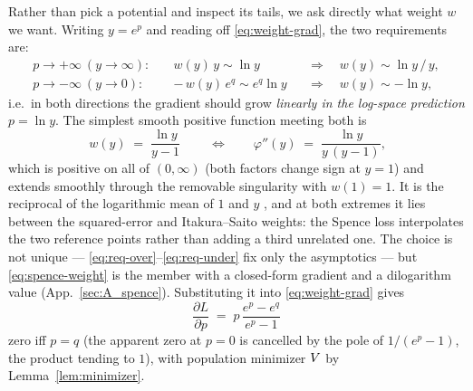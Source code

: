 Rather than pick a potential and inspect its tails, we ask directly what weight
$w$ we want. Writing $y=e^{p}$ and reading off \eqref{eq:weight-grad}, the two
requirements are:
\begin{align}
  p\to+\infty\ (y\to\infty):\quad & w(y)\,y \sim \ln y
    &&\Longrightarrow\quad w(y)\sim \ln y\,/\,y, \label{eq:req-over}\\
  p\to-\infty\ (y\to 0):\quad & -\,w(y)\,e^{q} \sim e^{q}\ln y
    &&\Longrightarrow\quad w(y)\sim -\ln y, \label{eq:req-under}
\end{align}
i.e.\ in both directions the gradient should grow \emph{linearly in the log-space
prediction} $p=\ln y$. The simplest smooth positive function meeting both is
\begin{equation}
  \boxed{\ w(y) \;=\; \frac{\ln y}{y-1}\ }
  \qquad\Longleftrightarrow\qquad
  \varphi''(y) \;=\; \frac{\ln y}{y\,(y-1)},
  \label{eq:spence-weight}
\end{equation}
which is positive on all of $(0,\infty)$ (both factors change sign at $y=1$)
and extends smoothly through the removable singularity with $w(1)=1$. It is the
reciprocal of the logarithmic mean of $1$ and $y$ \citep{carlson1972logmean}, and at both extremes it lies
between the squared-error and Itakura--Saito weights: the Spence loss
interpolates the two reference points rather than adding a third unrelated
one. The choice is not unique --- \eqref{eq:req-over}--\eqref{eq:req-under} fix
only the asymptotics --- but \eqref{eq:spence-weight} is the member with a
closed-form gradient and a dilogarithm value (App.~\ref{sec:A_spence}).
Substituting it into \eqref{eq:weight-grad} gives
\begin{equation}
  \boxed{\ \frac{\partial L}{\partial p} \;=\; p\,\frac{e^{p}-e^{q}}{e^{p}-1}\ }
  \label{eq:spence-grad}
\end{equation}
zero iff $p=q$ (the apparent zero at $p=0$ is cancelled by the pole of
$1/(e^{p}-1)$, the product tending to $1$), with population minimizer $V$ by
Lemma~\ref{lem:minimizer}.

